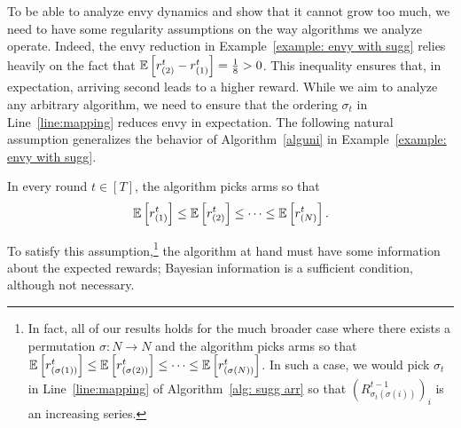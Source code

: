 To be able to analyze envy dynamics and show that it cannot grow too much, we need to have some regularity assumptions on the way algorithms we analyze operate. Indeed, the envy reduction in Example~\ref{example: envy with sugg} relies heavily on the fact that $\mathbb{E}\left[ r_{(2)}^t - r_{(1)}^t \right] = \frac{1}{8} > 0$. This inequality ensures that, in expectation, arriving second leads to a higher reward. While we aim to analyze any arbitrary algorithm, we need to ensure that the ordering $\sigma_t$ in Line~\ref{line:mapping} reduces envy in expectation.
The following natural assumption generalizes the behavior of Algorithm~\ref{alguni} in Example~\ref{example: envy with sugg}.\begin{assumption}\label{assumption: nudge alg ref}
In every round $t \in [T]$, the algorithm picks arms so that
\[
    \mathbb{E}\left[ r_{(1)}^t \right] \leq \mathbb{E}\left[ r_{(2)}^t \right]\leq \cdots \leq \mathbb{E}\left[ r_{(N)}^t \right].
\]
\end{assumption}
To satisfy this assumption,\footnote{In fact, all of our results holds for the much broader case where there exists a permutation $\sigma:N \rightarrow N$ and the algorithm picks arms so that 
$\mathbb{E}\left[ r_{(\sigma(1))}^t \right] \leq \mathbb{E}\left[ r_{(\sigma(2))}^t \right]\leq \cdots \leq \mathbb{E}\left[ r_{(\sigma(N))}^t \right]$. In such a case, we would pick $\sigma_t$ in Line~\ref{line:mapping} of Algorithm~\ref{alg: sugg arr} so that $\left(R^{t-1}_{\sigma_t(\sigma(i))}\right)_i$ is an increasing series.} the algorithm at hand must have some information about the expected rewards; Bayesian information is a sufficient condition, although not necessary.


